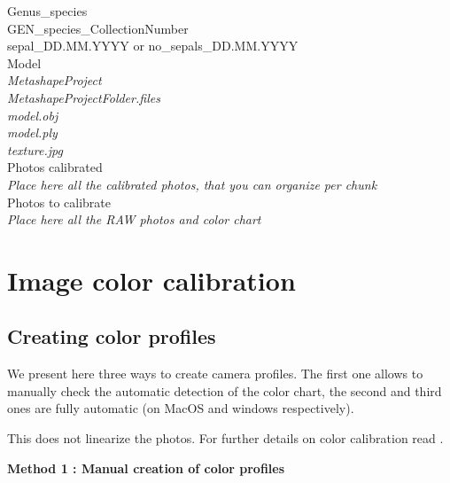 \documentclass[
]{book}
\begin{document}
Genus\_species\\
GEN\_species\_CollectionNumber\\
sepal\_DD.MM.YYYY or no\_sepals\_DD.MM.YYYY\\
Model\\
\emph{MetashapeProject}\\
\emph{MetashapeProjectFolder.files}\\
\emph{model.obj}\\
\emph{model.ply}\\
\emph{texture.jpg}\\
Photos calibrated\\
\emph{Place here all the calibrated photos, that you can organize per chunk}\\
Photos to calibrate\\
\emph{Place here all the RAW photos and color chart}\\

\hypertarget{image-color-calibration}{%
\section{Image color calibration}\label{image-color-calibration}}

\hypertarget{creating-color-profiles}{%
\subsection{Creating color profiles}\label{creating-color-profiles}}

We present here three ways to create camera profiles. The first one
allows to manually check the automatic detection of the color chart, the
second and third ones are fully automatic (on MacOS and windows
respectively).

This does not linearize the photos. For further details on color
calibration read \citep{troscianko2015image}.

\textbf{Method 1 : Manual creation of color profiles}
\end{document}
